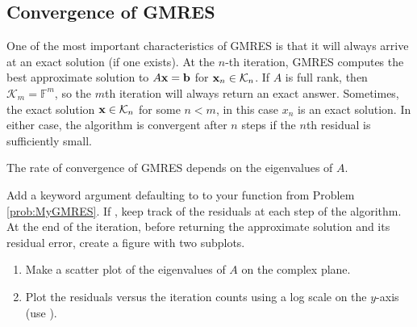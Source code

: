 \subsection*{Convergence of GMRES} %

One of the most important characteristics of GMRES is that it will always arrive at an exact solution (if one exists).
At the $n$-th iteration, GMRES computes the best approximate solution to $A\mathbf{x} = \mathbf{b}$ for $\mathbf{x}_n \in \mathcal{K}_n$.
If $A$ is full rank, then $\mathcal{K}_m = \mathbb{F}^m$, so the $m$th iteration will always return an exact answer.
Sometimes, the exact solution $\mathbf{x} \in \mathcal{K}_n$ for some $n<m$, in this case  $x_n$ is an exact solution.
In either case, the algorithm is convergent after $n$ steps if the $n$th residual is sufficiently small.

The rate of convergence of GMRES depends on the eigenvalues of $A$.

\begin{problem}
\label{prob:plot_gmres}
Add a keyword argument  defaulting to  to your function from Problem \ref{prob:MyGMRES}.
If , keep track of the residuals at each step of the algorithm.
At the end of the iteration, before returning the approximate solution and its residual error, create a figure with two subplots.
\begin{enumerate}
\item Make a scatter plot of the eigenvalues of $A$ on the complex plane.
\item Plot the residuals versus the iteration counts using a log scale on the $y$-axis\\(use ).
\end{enumerate}
\end{problem}

